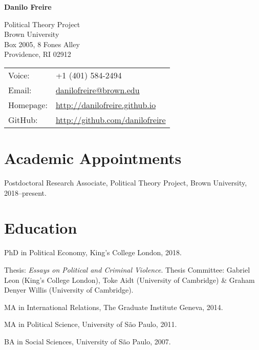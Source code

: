 \documentclass[a4paper]{article}
\def\name{Danilo Freire}
\renewenvironment{itemize}{
	\begin{list}{}{
			\setlength{\leftmargin}{1.5em}
		}
		}{
	\end{list}
}
\begin{document}
{\huge \bf \name}


\vspace{0.25in}

\begin{minipage}{0.45\linewidth}
	Political Theory Project \\
	Brown University \\
	Box 2005, 8 Fones Alley \\
	Providence, RI 02912 
\end{minipage}
\begin{minipage}{0.45\linewidth}
	\begin{tabular}{ll}
		Voice: & +1 (401) 584-2494 \\
		Email:          & \href{mailto:danilofreire@brown.edu}{danilofreire@brown.edu}          \\
		Homepage:       & \href{http://danilofreire.github.io/}{http://danilofreire.github.io}             \\
		GitHub:         & \href{http://github.com/danilofreire}{http://github.com/danilofreire}
	\end{tabular}
	\end{minipage}

	\section*{Academic Appointments}

	\begin{itemize}
		\item Postdoctoral Research Associate, Political Theory Project, Brown University, 2018--present.
	\end{itemize}

	\section*{Education}

	\begin{itemize}
		\item PhD in Political Economy, King's College London, 2018.
			\begin{itemize}
				\item Thesis: \textit{Essays on Political and Criminal Violence}. Thesis Committee: Gabriel Leon (King's College London), Toke Aidt (University of Cambridge) \& Graham Denyer Willis (University of Cambridge).
			\end{itemize}
		\item MA in International Relations, The Graduate Institute Geneva, 2014.
		\item MA in Political Science, University of São Paulo, 2011.
		\item BA in Social Sciences, University of São Paulo, 2007.
	\end{itemize}
\end{document}

